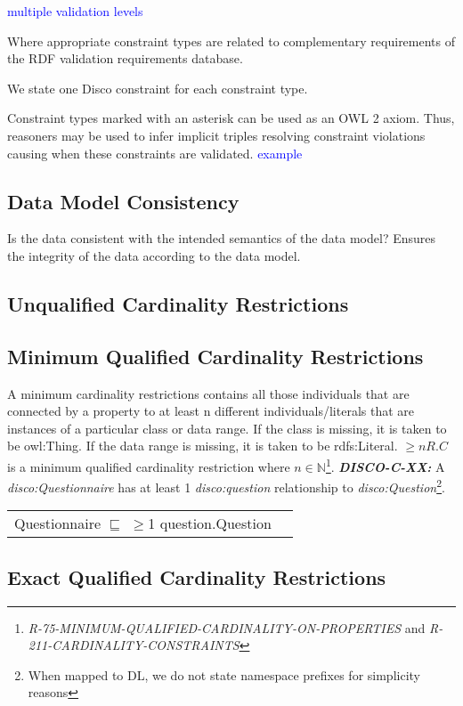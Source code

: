 \documentclass{elsart3p}    %
\newenvironment{DL}{
  \vspace{0cm}
  \begin{tabular}{l l}

}{
  \end{tabular}
}
\begin{document}
\textcolor{blue}{multiple validation levels}

Where appropriate constraint types are related to complementary requirements of the RDF validation requirements database.

We state one Disco constraint for each constraint type.

Constraint types marked with an asterisk can be used as an OWL 2 axiom.
Thus, reasoners may be used to infer implicit triples resolving constraint violations causing when these constraints are validated.
\textcolor{blue}{example}

\subsection{Data Model Consistency}

Is the data consistent with the intended semantics of the data model?
Ensures the integrity of the data according to the data model.

\subsection{Unqualified Cardinality Restrictions}

\subsection{Minimum Qualified Cardinality Restrictions}

A minimum cardinality restrictions contains all those individuals that are connected by a property to at least n different individuals/literals 
that are instances of a particular class or data range. If the class is missing, it is taken to be owl:Thing. 
If the data range is missing, it is taken to be rdfs:Literal.
$\geq n R. C$ is a minimum qualified cardinality restriction where $n \in \mathbb{N}$\footnote{{\em R-75-MINIMUM-QUALIFIED-CARDINALITY-ON-PROPERTIES} and {\em R-211-CARDINALITY-CONSTRAINTS}}.
\textbf{{\em DISCO-C-XX:}}
A {\em disco:Questionnaire} has at least 1 {\em disco:question} relationship to {\em disco:Question}\footnote{When mapped to DL, we do not state namespace prefixes for simplicity reasons}.

\begin{DL}
Questionnaire $\sqsubseteq$ $\geq$1 question.Question
\end{DL}

\subsection{Exact Qualified Cardinality Restrictions}
\end{document}
